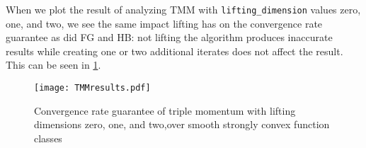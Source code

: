 When we plot the result of analyzing TMM with \texttt{lifting\_dimension} values zero, one, and two, we see the same impact lifting has on the convergence rate guarantee as did FG and HB: not lifting the algorithm produces inaccurate results while creating one or two additional iterates does not affect the result. This can be seen in \cref{TMMresults}.

\begin{figure}[h!]
    \centering
    \texttt{[image: TMMresults.pdf]}
    \caption{Convergence rate guarantee of triple momentum with lifting dimensions zero, one, and two,over smooth strongly convex function classes}
    \label{TMMresults}
\end{figure}